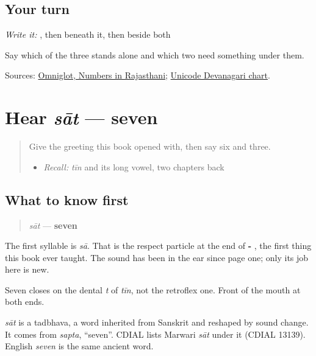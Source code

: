 \subsection*{Your turn}
\emph{Write it:} \textbf{}, then \textbf{} beneath it, then \textbf{} beside both

Say which of the three stands alone and which two need something under them.

\begin{tcolorbox}[breakable,colback=teal!4,colframe=teal!35!black,title={Before you move on}]
Sources: \href{https://www.omniglot.com/language/numbers/rajasthani.htm}{Omniglot, Numbers in Rajasthani}; \href{https://www.unicode.org/charts/PDF/U0900.pdf}{Unicode Devanagari chart}.
\end{tcolorbox}
\section[sāt]{Hear \emph{sāt} — seven}

\label{lesson:MW-C33-hear-saat}



\begin{quote}
Give the greeting this book opened with, then say six and three.

\begin{itemize}
\raggedright
  \item \emph{Recall:} \emph{tīn} and its long vowel, two chapters back
\end{itemize}
\end{quote}

\subsection*{What to know first}
\begin{quote}
\emph{sāt} — \textbf{seven}
\end{quote}

The first syllable is \emph{sā}. That is the respect particle at the end of \textbf{- }, the first thing this book ever taught. The sound has been in the ear since page one; only its job here is new.

Seven closes on the dental \emph{t} of \emph{tīn}, not the retroflex one. Front of the mouth at both ends.

\begin{cousinweb}
\emph{sāt} is a tadbhava, a word inherited from Sanskrit and reshaped by sound change. It comes from \emph{sapta}, \textquotedblleft{}seven\textquotedblright{}. CDIAL lists Marwari \emph{sāt} under it (CDIAL 13139). English \emph{seven} is the same ancient word.
\end{cousinweb}

